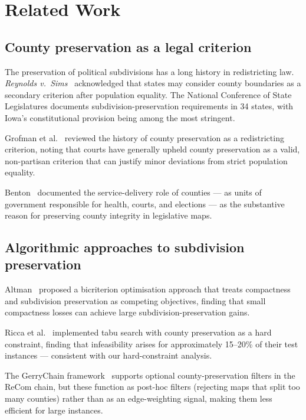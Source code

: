\section{Related Work}
\label{sec:related}

\subsection{County preservation as a legal criterion}

The preservation of political subdivisions has a long history in
redistricting law.  \emph{Reynolds v.\ Sims}~\citep{reynolds1964sims}
acknowledged that states may consider county boundaries as a secondary
criterion after population equality.  The National Conference of State
Legislatures documents subdivision-preservation requirements in 34 states,
with Iowa's constitutional provision being among the most stringent.

Grofman et al.~\citep{grofman1990representation} reviewed the history of
county preservation as a redistricting criterion, noting that courts have
generally upheld county preservation as a valid, non-partisan criterion
that can justify minor deviations from strict population equality.

Benton~\citep{benton2002counties} documented the service-delivery role
of counties --- as units of government responsible for health, courts,
and elections --- as the substantive reason for preserving county
integrity in legislative maps.

\subsection{Algorithmic approaches to subdivision preservation}

Altman~\citep{altman1998compactness} proposed a bicriterion optimisation
approach that treats compactness and subdivision preservation as competing
objectives, finding that small compactness losses can achieve large
subdivision-preservation gains.

Ricca et al.~\citep{ricca2008local} implemented tabu search with county
preservation as a hard constraint, finding that infeasibility arises for
approximately 15--20\% of their test instances --- consistent with our
hard-constraint analysis.

The GerryChain framework~\citep{deford2019recombination} supports optional
county-preservation filters in the ReCom chain, but these function as
post-hoc filters (rejecting maps that split too many counties) rather than
as an edge-weighting signal, making them less efficient for large instances.


